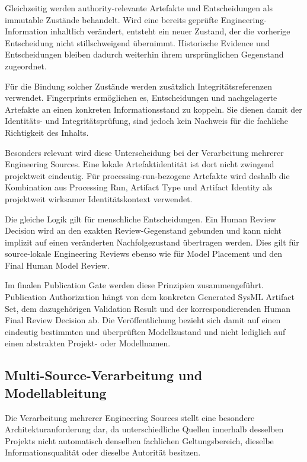 Gleichzeitig werden authority-relevante Artefakte und Entscheidungen als
immutable Zustände behandelt. Wird eine bereits geprüfte Engineering-Information
inhaltlich verändert, entsteht ein neuer Zustand, der die vorherige
Entscheidung nicht stillschweigend übernimmt. Historische Evidence und
Entscheidungen bleiben dadurch weiterhin ihrem ursprünglichen Gegenstand
zugeordnet.

Für die Bindung solcher Zustände werden zusätzlich Integritätsreferenzen
verwendet. Fingerprints ermöglichen es, Entscheidungen und nachgelagerte
Artefakte an einen konkreten Informationsstand zu koppeln. Sie dienen damit
der Identitäts- und Integritätsprüfung, sind jedoch kein Nachweis für die
fachliche Richtigkeit des Inhalts.

Besonders relevant wird diese Unterscheidung bei der Verarbeitung mehrerer
Engineering Sources. Eine lokale Artefaktidentität ist dort nicht zwingend
projektweit eindeutig. Für processing-run-bezogene Artefakte wird deshalb die
Kombination aus Processing Run, Artifact Type und Artifact Identity als
projektweit wirksamer Identitätskontext verwendet.

Die gleiche Logik gilt für menschliche Entscheidungen. Ein Human Review
Decision wird an den exakten Review-Gegenstand gebunden und kann nicht
implizit auf einen veränderten Nachfolgezustand übertragen werden. Dies gilt
für source-lokale Engineering Reviews ebenso wie für Model Placement und den
Final Human Model Review.

Im finalen Publication Gate werden diese Prinzipien zusammengeführt.
Publication Authorization hängt von dem konkreten Generated SysML Artifact
Set, dem dazugehörigen Validation Result und der korrespondierenden Human Final
Review Decision ab. Die Veröffentlichung bezieht sich damit auf einen
eindeutig bestimmten und überprüften Modellzustand und nicht lediglich auf
einen abstrakten Projekt- oder Modellnamen.

\subsection{Multi-Source-Verarbeitung und Modellableitung}
\label{sec:multisource_model_derivation}

Die Verarbeitung mehrerer Engineering Sources stellt eine besondere
Architekturanforderung dar, da unterschiedliche Quellen innerhalb desselben
Projekts nicht automatisch denselben fachlichen Geltungsbereich, dieselbe
Informationsqualität oder dieselbe Autorität besitzen.


